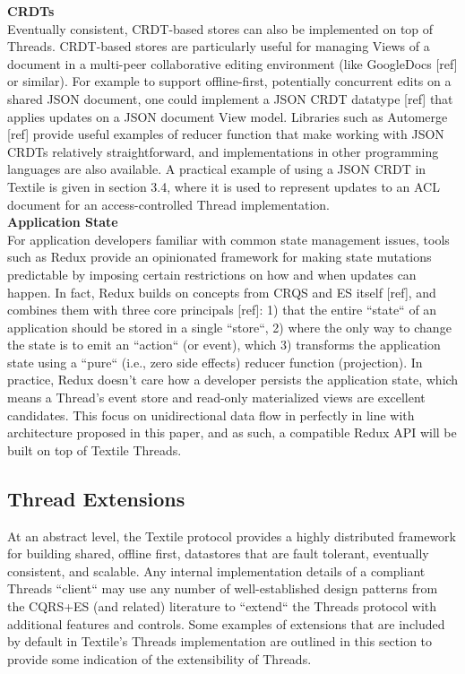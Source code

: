 \documentclass{comjnl}
\begin{document}
\textbf{CRDTs} \\

Eventually consistent, CRDT-based stores can also be implemented on top of Threads. CRDT-based stores are particularly useful for managing Views of a document in a multi-peer collaborative editing environment (like GoogleDocs [ref] or similar). For example to support offline-first, potentially concurrent edits on a shared JSON document, one could implement a JSON CRDT datatype [ref] that applies updates on a JSON document View model. Libraries such as Automerge [ref] provide useful examples of reducer function that make working with JSON CRDTs relatively straightforward, and implementations in other programming languages are also available. A practical example of using a JSON CRDT in Textile is given in section 3.4, where it is used to represent updates to an ACL document for an access-controlled Thread implementation.\\

\textbf{Application State} \\

For application developers familiar with common state management issues, tools such as Redux provide an opinionated framework for making state mutations predictable by imposing certain restrictions on how and when updates can happen. In fact, Redux builds on concepts from CRQS and ES itself [ref], and combines them with three core principals [ref]: 1) that the entire “state“ of an application should be stored in a single “store“, 2) where the only way to change the state is to emit an “action“ (or event), which 3) transforms the application state using a “pure“ (i.e., zero side effects) reducer function (projection). In practice, Redux doesn't care how a developer persists the application state, which means a Thread’s event store and read-only materialized views are excellent candidates. This focus on unidirectional data flow in perfectly in line with architecture proposed in this paper, and as such, a compatible Redux API will be built on top of Textile Threads.


\subsection{Thread Extensions}

At an abstract level, the Textile protocol provides a highly distributed framework for building shared, offline first, datastores that are fault tolerant, eventually consistent, and scalable. Any internal implementation details of a compliant Threads “client“ may use any number of well-established design patterns from the CQRS+ES (and related) literature to “extend“ the Threads protocol with additional features and controls. Some examples of extensions that are included by default in Textile’s Threads implementation are outlined in this section to provide some indication of the extensibility of Threads.
\end{document}
